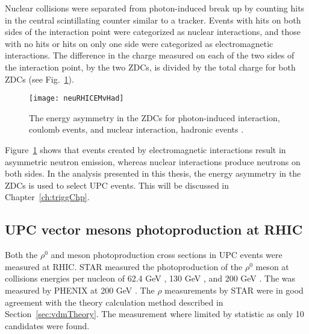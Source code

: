  Nuclear collisions were separated from photon-induced break up by counting
    hits in the central scintillating counter similar to a tracker. 
  Events with hits on both sides of the interaction point were categorized as
    nuclear interactions, and those with no hits or hits on only one side were
    categorized as electromagnetic interactions. 
  The difference in the charge measured on each of the two sides of the 
    interaction point, by the two ZDCs, is divided by the total charge
    for both ZDCs (see Fig.~\ref{fig:neuRHICEMvHad}).
  \begin{figure}[!Hhbt]
    \centering
    \texttt{[image: neuRHICEMvHad]}
    \caption{The energy asymmetry in the ZDCs for photon-induced interaction, 
      coulomb events, and nuclear interaction, hadronic events \cite{upcNeuPHENIX}.}
    \label{fig:neuRHICEMvHad}
  \end{figure}
  Figure~\ref{fig:neuRHICEMvHad} shows that events created by electromagnetic 
    interactions result in asymmetric neutron emission, whereas nuclear 
    interactions produce neutrons on both sides. 
  In the analysis presented in this thesis, the energy asymmetry in the ZDCs is
    used to select UPC events.
  This will be discussed in Chapter~\ref{ch:triggChp}.


    \subsection{ UPC vector mesons photoproduction at RHIC }
    
    Both the $\rho^{0}$ and \JPsi{} meson photoproduction cross sections in UPC 
      events were measured at RHIC.
    STAR measured the photoproduction of the $\rho^{0}$ meson at collisions 
      energies per nucleon of 62.4 GeV \cite{upcRhoSTAR12}, 130 GeV 
      \cite{upcRhoSTAR02}, and 200 GeV \cite{upcRhoSTAR08}. 
    The \JPsi{} was measured by PHENIX at 200 GeV \cite{upcJPsiPHENIX}.
    The $\rho$ measurements by STAR were in good agreement with the theory
      calculation method described in Section~\ref{sec:vdmTheory}.
    The \JPsi{ } measurement where limited by statistic as only 10 \JPsi{}
      candidates were found. 

